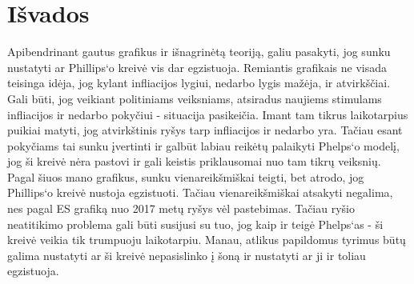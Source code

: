 \documentclass[11pt, titlepage]{article}
\begin{document}
\newpage
\section{Išvados}
Apibendrinant gautus grafikus ir išnagrinėtą teoriją, galiu pasakyti, jog sunku nustatyti ar Phillips‘o kreivė vis dar egzistuoja. Remiantis grafikais ne visada teisinga idėja, jog kylant infliacijos lygiui, nedarbo lygis mažėja, ir atvirkščiai. Gali būti, jog veikiant politiniams veiksniams, atsiradus naujiems stimulams infliacijos ir nedarbo pokyčiui - situacija pasikeičia. Imant tam tikrus laikotarpius puikiai matyti, jog atvirkštinis ryšys tarp infliacijos ir nedarbo yra. Tačiau esant pokyčiams tai sunku įvertinti ir galbūt labiau reikėtų palaikyti Phelps‘o modelį, jog ši kreivė nėra pastovi ir gali keistis priklausomai nuo tam tikrų veiksnių. Pagal šiuos mano grafikus, sunku vienareikšmiškai teigti, bet atrodo, jog Phillips‘o kreivė nustoja egzistuoti. Tačiau vienareikšmiškai atsakyti negalima, nes pagal ES grafiką nuo 2017 metų ryšys vėl pastebimas. Tačiau ryšio neatitikimo problema gali būti susijusi su tuo, jog kaip ir teigė Phelps‘as - ši kreivė veikia tik trumpuoju laikotarpiu. Manau, atlikus papildomus tyrimus būtų galima nustatyti ar ši kreivė nepasislinko į šoną ir nustatyti ar ji ir toliau egzistuoja.

\newpage



\end{document}
